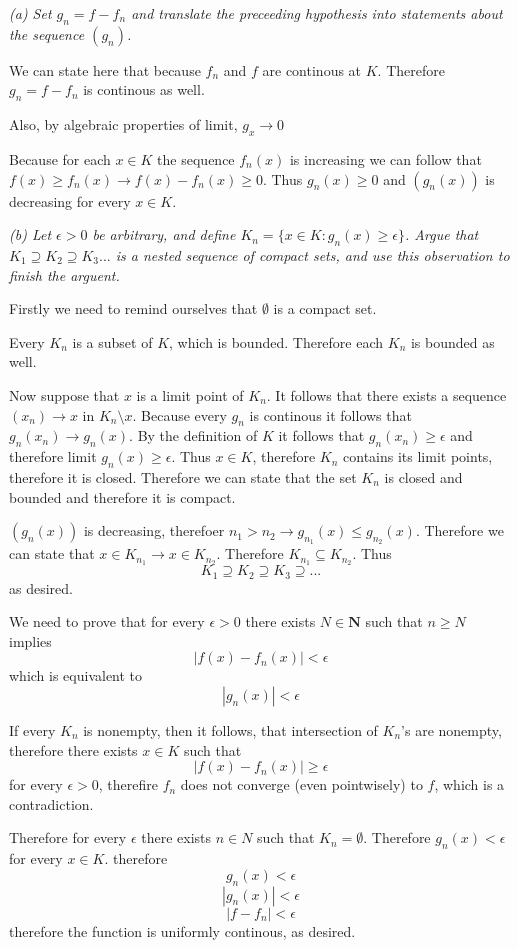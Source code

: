 \documentclass[11pt,oneside,titlepage]{book}
\begin{document}
\textit{(a) Set $g_n = f - f_n$ and translate the preceeding hypothesis
  into statements about the sequence $(g_n)$.}

We can state here that because $f_n$ and $f$ are continous at $K$.
Therefore $g_n = f - f_n$ is continous as well.

Also, by algebraic properties of limit, $g_x \to 0$ 

Because for each $x \in K$ the sequence $f_n(x)$ is increasing we
can follow that $f(x) \geq f_n(x) \to f(x) - f_n(x) \geq 0$. Thus
$g_n(x) \geq 0$ and $(g_n(x))$ is decreasing for every $x \in K$.

\textit{(b) Let $\epsilon > 0$ be arbitrary, and define
  $K_n = \{x \in K: g_n(x) \geq \epsilon\}$. Argue that $K_1 \supseteq K_2
  \supseteq K_3 ...$ is a nested sequence of compact sets, and use this
  observation to finish the arguent.}

Firstly we need to remind ourselves that $\emptyset$ is a compact set.

Every $K_n$ is a subset of $K$, which is bounded. Therefore
each $K_n$ is bounded as well.

Now suppose that $x$ is a limit point of $K_n$. It follows that there
exists a sequence $(x_n) \to x$ in $K_n \setminus x$.
Because every  $g_n$ is continous it follows that $g_n(x_n) \to g_n(x)$.
By the definition of $K$ it follows that  $g_n(x_n) \geq \epsilon$ and
therefore limit $g_n(x) \geq \epsilon$. Thus $x \in K$, therefore
$K_n$ contains its limit points, therefore it is closed.
Therefore we can state that the set $K_n$ is closed and bounded and therefore
it is compact.

$(g_n(x))$ is decreasing, therefoer $n_1 > n_2 \to g_{n_1}(x) \leq g_{n_2}(x)$.
Therefore we can state that $x \in K_{n_1} \to x \in K_{n_2}$. Therefore
$K_{n_1} \subseteq K_{n_2}$. Thus
$$K_1 \supseteq K_2  \supseteq K_3 \supseteq ... $$
as desired.


We need to prove that for every $\epsilon > 0$ there exists $N \in \textbf{N}$
such that $n \geq N$ implies
$$|f(x) - f_n(x)| < \epsilon$$
which is equivalent to 
$$|g_n(x)| < \epsilon$$

If every $K_n$ is nonempty, then it follows, that intersection of
$K_n$'s are nonempty, therefore there exists $x \in K$ such that
$$|f(x) - f_n(x)| \geq \epsilon$$
for every $\epsilon > 0$, therefire $f_n$ does not converge (even pointwisely)
to $f$, which is a contradiction.

Therefore for every $\epsilon$ there exists $n \in N$ such that
$K_n = \emptyset$. Therefore $g_n(x) < \epsilon$ for every $x \in K$.
therefore
$$g_n(x) < \epsilon$$
$$|g_n(x)| < \epsilon$$
$$|f - f_n| < \epsilon$$
therefore the function is uniformly continous, as desired.
\end{document}
